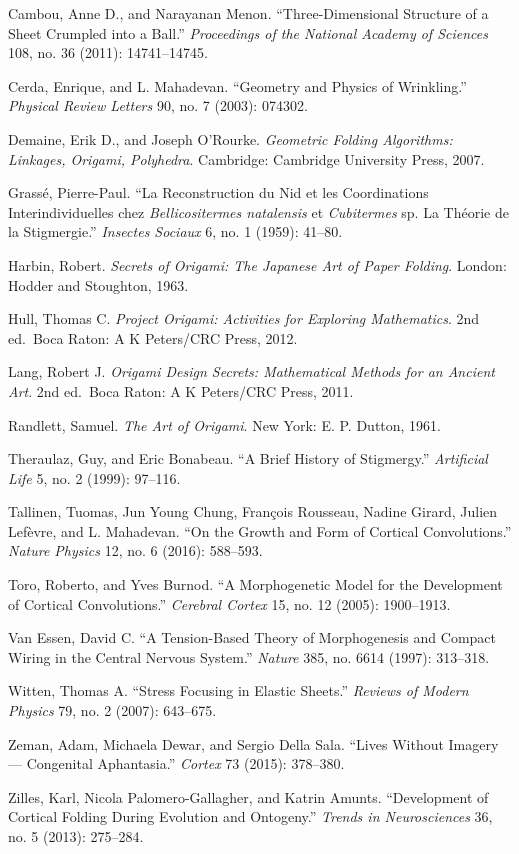 \documentclass[11pt,oneside]{book}
\begin{document}
Cambou, Anne D., and Narayanan Menon. ``Three-Dimensional Structure of a
Sheet Crumpled into a Ball.'' \emph{Proceedings of the National Academy
of Sciences} 108, no. 36 (2011): 14741--14745.

Cerda, Enrique, and L. Mahadevan. ``Geometry and Physics of Wrinkling.''
\emph{Physical Review Letters} 90, no. 7 (2003): 074302.

Demaine, Erik D., and Joseph O'Rourke. \emph{Geometric Folding
Algorithms: Linkages, Origami, Polyhedra}. Cambridge: Cambridge
University Press, 2007.

Grassé, Pierre-Paul. ``La Reconstruction du Nid et les Coordinations
Interindividuelles chez \emph{Bellicositermes natalensis} et
\emph{Cubitermes} sp. La Théorie de la Stigmergie.'' \emph{Insectes
Sociaux} 6, no. 1 (1959): 41--80.

Harbin, Robert. \emph{Secrets of Origami: The Japanese Art of Paper
Folding}. London: Hodder and Stoughton, 1963.

Hull, Thomas C. \emph{Project Origami: Activities for Exploring
Mathematics}. 2nd ed.~Boca Raton: A K Peters/CRC Press, 2012.

Lang, Robert J. \emph{Origami Design Secrets: Mathematical Methods for
an Ancient Art}. 2nd ed.~Boca Raton: A K Peters/CRC Press, 2011.

Randlett, Samuel. \emph{The Art of Origami}. New York: E. P. Dutton,
1961.

Theraulaz, Guy, and Eric Bonabeau. ``A Brief History of Stigmergy.''
\emph{Artificial Life} 5, no. 2 (1999): 97--116.

Tallinen, Tuomas, Jun Young Chung, François Rousseau, Nadine Girard,
Julien Lefèvre, and L. Mahadevan. ``On the Growth and Form of Cortical
Convolutions.'' \emph{Nature Physics} 12, no. 6 (2016): 588--593.

Toro, Roberto, and Yves Burnod. ``A Morphogenetic Model for the
Development of Cortical Convolutions.'' \emph{Cerebral Cortex} 15, no.
12 (2005): 1900--1913.

Van Essen, David C. ``A Tension-Based Theory of Morphogenesis and
Compact Wiring in the Central Nervous System.'' \emph{Nature} 385, no.
6614 (1997): 313--318.

Witten, Thomas A. ``Stress Focusing in Elastic Sheets.'' \emph{Reviews
of Modern Physics} 79, no. 2 (2007): 643--675.

Zeman, Adam, Michaela Dewar, and Sergio Della Sala. ``Lives Without
Imagery --- Congenital Aphantasia.'' \emph{Cortex} 73 (2015): 378--380.

Zilles, Karl, Nicola Palomero-Gallagher, and Katrin Amunts.
``Development of Cortical Folding During Evolution and Ontogeny.''
\emph{Trends in Neurosciences} 36, no. 5 (2013): 275--284.
\end{document}
